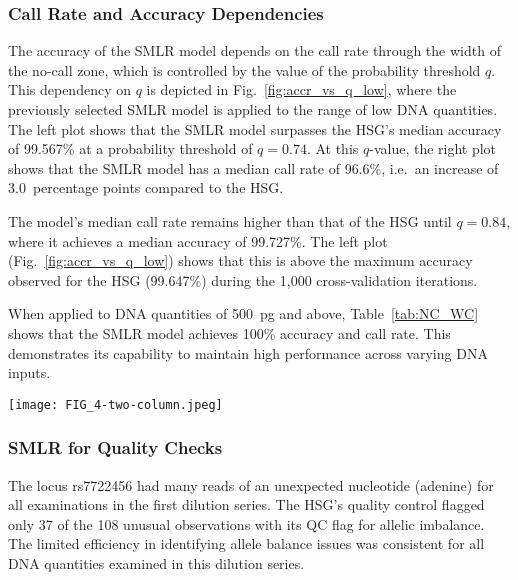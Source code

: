 \documentclass[preprint,5p,times,11pt]{elsarticle}
\begin{document}
\subsubsection{Call Rate and Accuracy Dependencies}
The accuracy of the SMLR model depends on the call rate through the width of the no-call zone, which is controlled by the value of the probability threshold $q$.
This dependency on $q$ is depicted in Fig.~\ref{fig:accr_vs_q_low}, where the previously selected SMLR model is applied to the range of low DNA quantities.
The left plot shows that the SMLR model surpasses the HSG's median accuracy of 99.567\% at a probability threshold of $q=0.74$.
At this $q$-value, the right plot shows that the SMLR model has a median call rate of 96.6\%, i.e.~an increase of 3.0~percentage points compared to the HSG.

The model's median call rate remains higher than that of the HSG until $q=0.84$, where it achieves a median accuracy of 99.727\%.
The left plot (Fig.~\ref{fig:accr_vs_q_low}) shows that this is above the maximum accuracy observed for the HSG (99.647\%) during the 1,000 cross-validation iterations.

When applied to DNA quantities of \SI{500}{\pg} and above, Table~\ref{tab:NC_WC} shows that the SMLR model achieves 100\% accuracy and call rate.
This demonstrates its capability to maintain high performance across varying DNA inputs.
\begin{figure*}
\centering
\texttt{[image: FIG\_4-two-column.jpeg]}
\caption{
Performance of the SMLR model across probability thresholds, $q$ (legend applies to both plots).\\
The grey lines depict the SMLR model's performance in 1,000 cross-validation iterations.
The model was fitted with an intercept to square-root transformed allele signals and tested on data from the examinations of the DNA quantities indicated above the plots.
Dotted lines mark the 25th and 75th percentiles among the 1,000 cross-validations, while dashed lines indicate medians.
The shaded horizontal bars represent the accuracy~(left) and call rate~(right) ranges for the HID SNP Genotyper Plugin.
}
\label{fig:accr_vs_q_low}
\end{figure*}


\subsubsection{SMLR for Quality Checks}
The locus rs7722456 had many reads of an unexpected nucleotide (adenine) for all examinations in the first dilution series.
The HSG's quality control flagged only 37 of the 108 unusual observations with its QC flag for allelic imbalance.
The limited efficiency in identifying allele balance issues was consistent for all DNA quantities examined in this dilution series.
\end{document}
